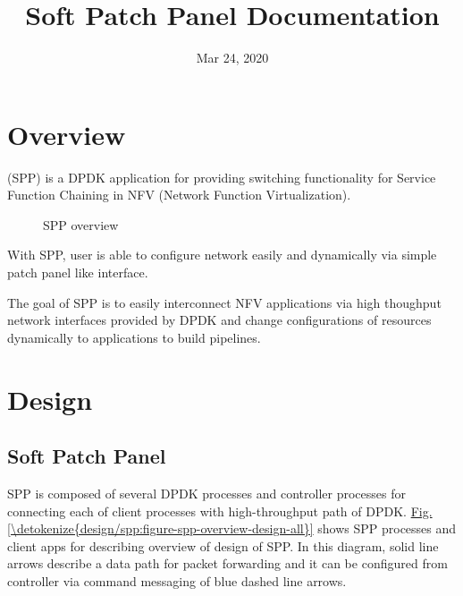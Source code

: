 \documentclass[a4paper,11pt,openany,oneside,english]{sphinxmanual}
\title{Soft Patch Panel Documentation}
\date{Mar 24, 2020}
\author{}
\begin{document}
\pagestyle{empty}
\sphinxmaketitle
\pagestyle{plain}
\sphinxtableofcontents
\pagestyle{normal}
\label{\detokenize{index::doc}}



\chapter{Overview}
\label{\detokenize{overview:overview}}\label{\detokenize{overview:spp-overview-overview}}\label{\detokenize{overview::doc}}
(SPP) is a DPDK application for providing switching
functionality for Service Function Chaining in
NFV (Network Function Virtualization).

\begin{figure}[htbp]
\centering
\capstart

\noindent{}
\caption{SPP overview}\label{\detokenize{overview:id1}}\end{figure}

With SPP, user is able to configure network easily and dynamically
via simple patch panel like interface.

The goal of SPP is to easily interconnect NFV applications via high
thoughput network interfaces provided by DPDK and change configurations
of resources dynamically to applications to build pipelines.


\chapter{Design}
\label{\detokenize{design/index:design}}\label{\detokenize{design/index:spp-design-index}}\label{\detokenize{design/index::doc}}

\section{Soft Patch Panel}
\label{\detokenize{design/spp:soft-patch-panel}}\label{\detokenize{design/spp:spp-overview-design}}\label{\detokenize{design/spp::doc}}
SPP is composed of several DPDK processes and controller processes for
connecting each of client processes with high-throughput path of DPDK.
\hyperref[\detokenize{design/spp:figure-spp-overview-design-all}]{Fig.\@ \ref{\detokenize{design/spp:figure-spp-overview-design-all}}} shows SPP processes and client apps
for describing overview of design of SPP. In this diagram, solid line arrows
describe a data path for packet forwarding and it can be configured from
controller via command messaging of blue dashed line arrows.
\end{document}
